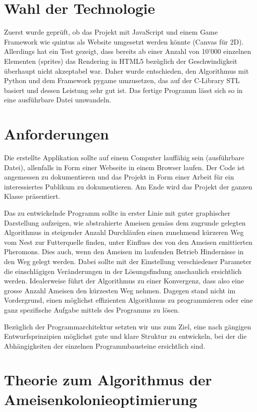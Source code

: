 \section{Wahl der Technologie}

Zuerst wurde geprüft, ob das Projekt mit JavaScript und einem Game Framework wie
quintus als Website umgesetzt werden könnte (Canvas für 2D). Allerdings hat ein
Test gezeigt, dass bereits ab einer Anzahl von 10'000 einzelnen Elementen
(sprites) das Rendering in HTML5 bezüglich der Geschwindigkeit überhaupt nicht
akzeptabel war. Daher wurde entschieden, den Algorithmus mit Python und dem
Framework pygame umzusetzen, das auf der C-Library STL basiert und dessen
Leistung sehr gut ist. Das fertige Programm lässt sich so in eine ausführbare
Datei umwandeln.

\section{Anforderungen}

Die erstellte Applikation sollte auf einem Computer lauffähig sein (ausführbare
Datei), allenfalls in Form einer Webseite in einem Browser laufen. Der Code ist
angemessen zu dokumentieren und das Projekt in Form einer Arbeit für ein
interessiertes Publikum zu dokumentieren. Am Ende wird das Projekt der ganzen
Klasse präsentiert.

Das zu entwickelnde Programm sollte in erster Linie mit guter graphischer
Darstellung aufzeigen, wie abstrahierte Ameisen gemäss dem zugrunde gelegten
Algorithmus in steigender Anzahl Durchläufen einen zunehmend kürzeren Weg vom
Nest zur Futterquelle finden, unter Einfluss des von den Ameisen emittierten
Pheromons. Dies auch, wenn den Ameisen im laufenden Betrieb Hindernisse in den
Weg gelegt werden. Dabei sollte mit der Einstellung verschiedener Parameter die
einschlägigen Veränderungen in der Lösungsfindung anschaulich ersichtlich
werden. Idealerweise führt der Algorithmus zu einer Konvergenz, dass also eine
grosse Anzahl Ameisen den kürzesten Weg nehmen. Dagegen stand nicht im
Vordergrund, einen möglichst effizienten Algorithmus zu programmieren oder eine
ganz spezifische Aufgabe mittels des Programms zu lösen.

Bezüglich der Programmarchitektur setzten wir uns zum Ziel, eine nach gängigen
Entwurfsprinzipien möglichst gute und klare Struktur zu entwickeln, bei der die
Abhängigkeiten der einzelnen Programmbausteine ersichtlich sind.

\section{Theorie zum Algorithmus der Ameisenkolonieoptimierung}

